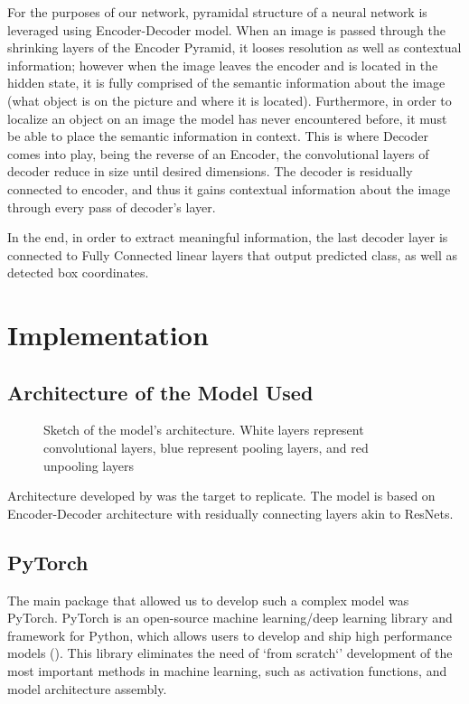 For the purposes of our network, pyramidal structure of a neural network is leveraged using
Encoder-Decoder model. When an image is passed through the shrinking layers of the Encoder
Pyramid, it looses resolution as well as contextual information; however when the image
leaves the encoder and is located in the hidden state, it is fully comprised of
the semantic information about the image (what object is on the picture and where it is
located). Furthermore, in order to localize an object on an image the model has never 
encountered before, it must be able to place the semantic information in context. 
This is where Decoder comes into play, being the reverse of an Encoder, the convolutional
layers of decoder reduce in size until desired dimensions. The decoder is residually
connected to encoder, and thus it gains contextual information about the image through
every pass of decoder's layer.

In the end, in order to extract meaningful information, the last decoder layer is connected to Fully Connected linear layers that output predicted class, as well as
detected box coordinates.
 

\section{Implementation}

\subsection{Architecture of the Model Used}

\begin{figure}[h]
	\begin{center}
	
	\end{center}
	\caption{Sketch of the model's architecture. White layers represent convolutional layers,
	blue represent pooling layers, and red unpooling layers}
\end{figure}

Architecture developed by  was the target to replicate. The model is based
on Encoder-Decoder architecture with residually connecting layers akin to ResNets.

\subsection{PyTorch}

The main package that allowed us to develop such a complex model was PyTorch. PyTorch
is an open-source machine learning/deep learning library and framework for Python, 
which allows users to develop and ship high performance models (). This library
eliminates the need of `from scratch`' development of the most important methods in machine learning,
such as activation functions, and model architecture assembly.


